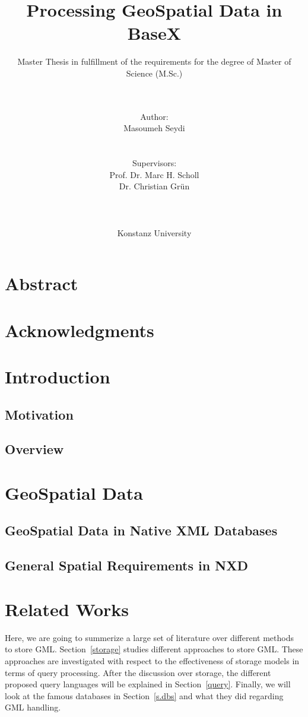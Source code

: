 \documentclass[a4paper,12pt]{article}
\title{Processing GeoSpatial Data in BaseX}
\subtitle{Master Thesis in fulfillment of the requirements for the degree of
Master of Science (M.Sc.)}
\author{\\\\Author: \\
	Masoumeh Seydi
	\\\\\\Supervisors: \\
	Prof. Dr. Marc H. Scholl \\ 
	Dr. Christian Gr{\"u}n \\
	\\\\\\
	Konstanz University}
\begin{document}
\maketitle
\thispagestyle{empty}

\newpage
\section*{Abstract}

\thispagestyle{empty}

\newpage
\section*{Acknowledgments}

\thispagestyle{empty}

\newpage
\tableofcontents

\thispagestyle{empty}
\newpage
\section{Introduction}
\setcounter{page}{1}

\subsection{Motivation}

\subsection{Overview}

\newpage
\section{GeoSpatial Data}

\subsection{GeoSpatial Data in Native XML Databases}

\subsection{General Spatial Requirements in NXD}
\newpage

\section{Related Works}
Here, we are going to summerize a large set of literature over different methods
to store GML. Section~\ref{storage} studies
different approaches to store GML. These approaches are investigated
with respect to the effectiveness of storage models in terms of query processing.
After the discussion over storage, the different proposed query languages
will be explained in Section~\ref{query}. Finally, we will look at the
famous databases in Section~\ref{s.dbs} and what they did regarding GML
handling.
  
\end{document}
